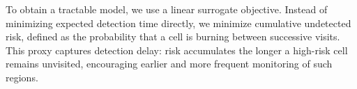 \documentclass[pdflatex,sn-mathphys-num]{sn-jnl}%
\theoremstyle{thmstyleone}%
\theoremstyle{thmstyletwo}%
\theoremstyle{thmstylethree}%
\begin{document}
To obtain a tractable model, we use a linear surrogate objective. Instead of minimizing expected detection time directly, we minimize cumulative undetected risk, defined as the probability that a cell is burning between successive visits. This proxy captures detection delay: risk accumulates the longer a high-risk cell remains unvisited, encouraging earlier and more frequent monitoring of such regions.



\end{document}
